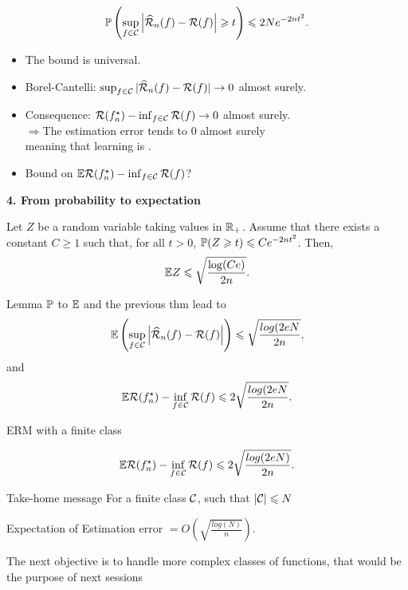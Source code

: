 \documentclass[xcolor={usenames,dvipsnames},handout]{beamer}
\begin{document}
\begin{frame}
$$
\P \left( \sup_{f\in \Cc} \left| \widehat{\Rc}_n(f) - \Rc(f)  \right| \geq t  \right) \leq 2N e^{-2nt^2}.
$$
\begin{itemize}
\item The bound is universal.
\item Borel-Cantelli: $\sup_{f\in \Cc} |\widehat{\Rc}_n(f) - \Rc(f) | \to 0$ almost surely. 
\item Consequence: $\Rc(f_n^\star) - \inf_{f\in \Cc} \Rc(f)  \to 0$  almost surely. \\
$ \Rightarrow$The estimation error tends to 0 almost surely\\
 meaning that learning is .
\item Bound on $\E \Rc (f_n^\star) - \inf_{f\in \Cc} \Rc(f)$?
\end{itemize}
\end{frame}

\begin{frame}

\textbf{4. From probability to expectation} \hfill \\
\begin{lemma}[$\P$ to $\E$]
\label{lem:PtoE}
Let $Z$ be a random variable taking values in $\R_+$. Assume that there exists a constant $C\geq 1$ such that, for all $t>0$, $\P (Z\geq t) \leq  C e^{-2nt^2}$.
Then,
$$
\E Z\leq  \sqrt{\frac{\log(Ce)}{2n}}.
$$
\end{lemma}


Lemma $\P$ to $\E$ and the previous thm lead to
$$
 \E \left(  \sup_{f\in \Cc} \left| \widehat{\Rc}_n(f) - \Rc(f)  \right| \right) \leq \sqrt{\frac{log(2eN}{2n}},
$$
and
$$
\E \Rc( f_n^\star) - \inf_{f\in\Cc} \Rc (f) \leq 2 \sqrt{\frac{log(2eN}{2n}}.
$$
\end{frame}

\begin{frame}{ERM with a finite class}

$$
\E \Rc( f_n^\star) - \inf_{f\in\Cc} \Rc (f) \leq 2 \sqrt{\frac{log(2eN)}{2n}}.
$$
\begin{alertblock}{Take-home message}
For a finite class $\Cc$, such that $|\Cc|\leq N$
\begin{center}
Expectation of Estimation error $= O \left(\sqrt{\frac{log(N)}{n}} \right)   $.
\end{center}
\end{alertblock}

The next objective is to handle more complex classes of functions, that would be the purpose of next sessions

\vspace{.2cm}


\end{frame}
\end{document}
